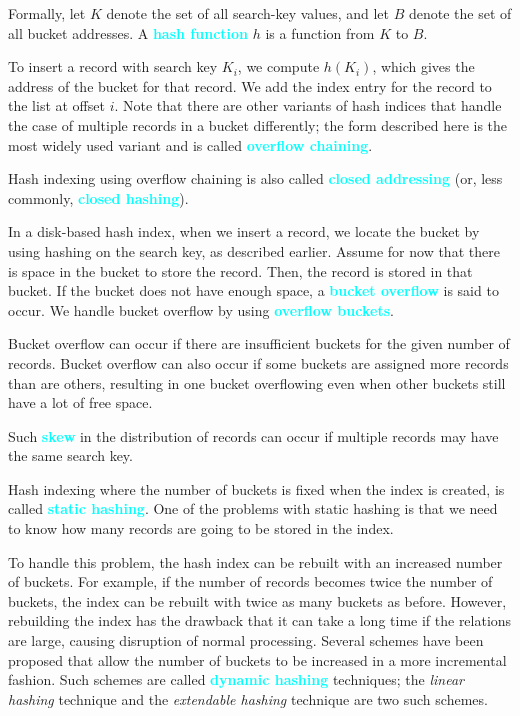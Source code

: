 \documentclass[a4paper,12pt,twoside,openany]{book}
\newcommand{\textcy}[1]{\textbf{\textcolor{cyan}{#1}}}
\begin{document}
Formally, let $K$ denote the set of all search-key values, and let $B$ denote the set of all bucket addresses. A \textcy{hash function} $h$ is a function from $K$ to $B$.

To insert a record with search key $K_i$, we compute $h(K_i)$, which gives the address of the bucket for that record. We add the index entry for the record to the list at offset $i$. Note that there are other variants of hash indices that handle the case of multiple records in a bucket differently; the form described here is the most widely used variant and is called \textcy{overflow chaining}.

Hash indexing using overflow chaining is also called \textcy{closed addressing} (or, less commonly, \textcy{closed hashing}).

In a disk-based hash index, when we insert a record, we locate the bucket by using hashing on the search key, as described earlier. Assume for now that there is space in the bucket to store the record. Then, the record is stored in that bucket. If the bucket does not have enough space, a \textcy{bucket overflow} is said to occur. We handle bucket overflow by using \textcy{overflow buckets}.

Bucket overflow can occur if there are insufficient buckets for the given number of records. Bucket overflow can also occur if some buckets are assigned more records than are others, resulting in one bucket overflowing even when other buckets still have a lot of free space.

Such \textcy{skew} in the distribution of records can occur if multiple records may have the same search key.

Hash indexing where the number of buckets is fixed when the index is created, is called \textcy{static hashing}. One of the problems with static hashing is that we need to know how many records are going to be stored in the index.

To handle this problem, the hash index can be rebuilt with an increased number of buckets. For example, if the number of records becomes twice the number of buckets, the index can be rebuilt with twice as many buckets as before. However, rebuilding the index has the drawback that it can take a long time if the relations are large, causing disruption of normal processing. Several schemes have been proposed that allow the number of buckets to be increased in a more incremental fashion. Such schemes are called \textcy{dynamic hashing} techniques; the \textit{linear hashing} technique and the \textit{extendable hashing} technique are two such schemes.
\end{document}
